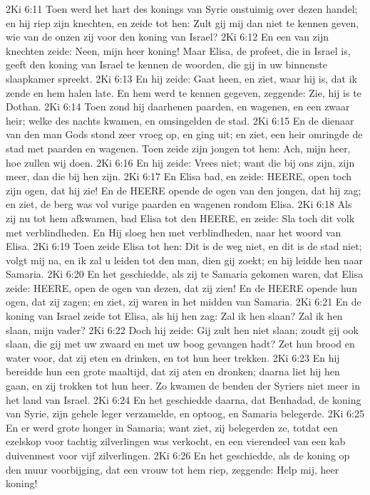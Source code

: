 2Ki 6:11  Toen werd het hart des konings van Syrie onstuimig over dezen handel; en hij riep zijn knechten, en zeide tot hen: Zult gij mij dan niet te kennen geven, wie van de onzen zij voor den koning van Israel?
2Ki 6:12  En een van zijn knechten zeide: Neen, mijn heer koning! Maar Elisa, de profeet, die in Israel is, geeft den koning van Israel te kennen de woorden, die gij in uw binnenste slaapkamer spreekt.
2Ki 6:13  En hij zeide: Gaat heen, en ziet, waar hij is, dat ik zende en hem halen late. En hem werd te kennen gegeven, zeggende: Zie, hij is te Dothan.
2Ki 6:14  Toen zond hij daarhenen paarden, en wagenen, en een zwaar heir; welke des nachts kwamen, en omsingelden de stad.
2Ki 6:15  En de dienaar van den man Gods stond zeer vroeg op, en ging uit; en ziet, een heir omringde de stad met paarden en wagenen. Toen zeide zijn jongen tot hem: Ach, mijn heer, hoe zullen wij doen.
2Ki 6:16  En hij zeide: Vrees niet; want die bij ons zijn, zijn meer, dan die bij hen zijn.
2Ki 6:17  En Elisa bad, en zeide: HEERE, open toch zijn ogen, dat hij zie! En de HEERE opende de ogen van den jongen, dat hij zag; en ziet, de berg was vol vurige paarden en wagenen rondom Elisa.
2Ki 6:18  Als zij nu tot hem afkwamen, bad Elisa tot den HEERE, en zeide: Sla toch dit volk met verblindheden. En Hij sloeg hen met verblindheden, naar het woord van Elisa.
2Ki 6:19  Toen zeide Elisa tot hen: Dit is de weg niet, en dit is de stad niet; volgt mij na, en ik zal u leiden tot den man, dien gij zoekt; en hij leidde hen naar Samaria.
2Ki 6:20  En het geschiedde, als zij te Samaria gekomen waren, dat Elisa zeide: HEERE, open de ogen van dezen, dat zij zien! En de HEERE opende hun ogen, dat zij zagen; en ziet, zij waren in het midden van Samaria.
2Ki 6:21  En de koning van Israel zeide tot Elisa, als hij hen zag: Zal ik hen slaan? Zal ik hen slaan, mijn vader?
2Ki 6:22  Doch hij zeide: Gij zult hen niet slaan; zoudt gij ook slaan, die gij met uw zwaard en met uw boog gevangen hadt? Zet hun brood en water voor, dat zij eten en drinken, en tot hun heer trekken.
2Ki 6:23  En hij bereidde hun een grote maaltijd, dat zij aten en dronken; daarna liet hij hen gaan, en zij trokken tot hun heer. Zo kwamen de benden der Syriers niet meer in het land van Israel.
2Ki 6:24  En het geschiedde daarna, dat Benhadad, de koning van Syrie, zijn gehele leger verzamelde, en optoog, en Samaria belegerde.
2Ki 6:25  En er werd grote honger in Samaria; want ziet, zij belegerden ze, totdat een ezelskop voor tachtig zilverlingen was verkocht, en een vierendeel van een kab duivenmest voor vijf zilverlingen.
2Ki 6:26  En het geschiedde, als de koning op den muur voorbijging, dat een vrouw tot hem riep, zeggende: Help mij, heer koning!

